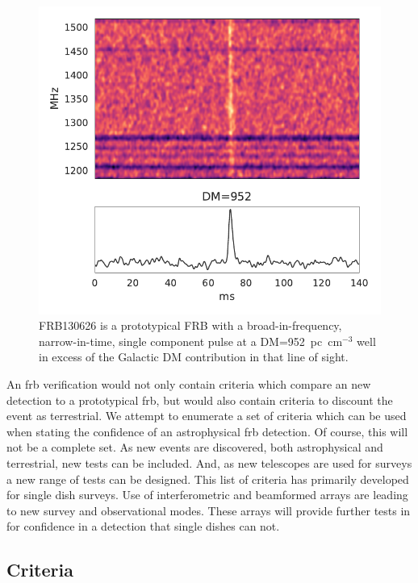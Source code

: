 \documentclass[a4paper,fleqn,usenatbib]{mnras}
\begin{document}
\begin{figure}
    \includegraphics[width=1.0\linewidth]{figures/FRB130626.pdf}
    \caption{FRB130626 is a prototypical FRB with a broad-in-frequency,
    narrow-in-time, single component pulse at a DM=952~pc~cm$^{-3}$ well in
    excess of the Galactic DM contribution in that line of sight.
    }
    \label{fig:FRB130626}
\end{figure}

An \gls{frb} verification would not only contain criteria which compare an new
detection to a prototypical \gls{frb}, but would also contain criteria to
discount the event as terrestrial. We attempt to enumerate a set of criteria
which can be used when stating the confidence of an astrophysical \gls{frb}
detection. Of course, this will not be a complete set. As new events are
discovered, both astrophysical and terrestrial, new tests can be included. And,
as new telescopes are used for surveys a new range of tests can be designed.
This list of criteria has primarily developed for single dish surveys.  Use of
interferometric and beamformed arrays are leading to new survey and
observational modes. These arrays will provide further tests in for confidence
in a detection that single dishes can not.

\subsection{Criteria}
\end{document}
